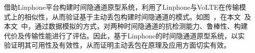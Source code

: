 
借助Linphone平台构建时间隐通道原型系统，利用了Linphone与VoLTE在传输模式上的相似性，从而验证基于主动丢包构建时间隐通道的模式。如图\ ，在本文\ 及本文\ 中，通过数据模拟的方式，对两种时间隐通道的抗检测能力、鲁棒性、构建代价及传输性能进行了评估。因此，基于Linphone的时间隐通道原型系统，以实验证明其可用性及有效性，从而证明主动丢包在原理及应用方面切实有效。